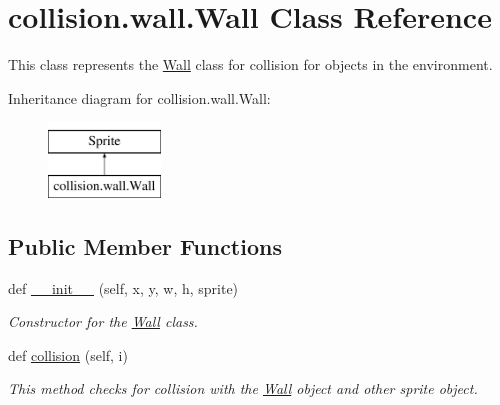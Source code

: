 \hypertarget{classcollision_1_1wall_1_1_wall}{}\section{collision.\+wall.\+Wall Class Reference}
\label{classcollision_1_1wall_1_1_wall}


This class represents the \hyperlink{classcollision_1_1wall_1_1_wall}{Wall} class for collision for objects in the environment.  


Inheritance diagram for collision.\+wall.\+Wall\+:\begin{figure}[H]
\begin{center}
\leavevmode
\includegraphics[height=2.000000cm]{classcollision_1_1wall_1_1_wall}
\end{center}
\end{figure}
\subsection*{Public Member Functions}
\begin{DoxyCompactItemize}
\item 
def \hyperlink{classcollision_1_1wall_1_1_wall_a9e55a33a1a456adb22a7dadc4f26be4c}{\+\_\+\+\_\+init\+\_\+\+\_\+} (self, x, y, w, h, sprite)
\begin{DoxyCompactList}\small\item\em Constructor for the \hyperlink{classcollision_1_1wall_1_1_wall}{Wall} class. \end{DoxyCompactList}\item 
def \hyperlink{classcollision_1_1wall_1_1_wall_a9514acfca4d222ec8d838d7bb29aeb1e}{collision} (self, i)
\begin{DoxyCompactList}\small\item\em This method checks for collision with the \hyperlink{classcollision_1_1wall_1_1_wall}{Wall} object and other sprite object. \end{DoxyCompactList}\end{DoxyCompactItemize}
